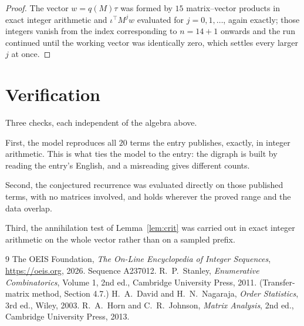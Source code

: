 \documentclass[11pt,a4paper]{article}
\theoremstyle{plain}
\theoremstyle{definition}
\begin{document}
\begin{proof}
The vector $w=q(M)\tau$ was formed by $15$ matrix--vector products in exact integer
arithmetic and $\iota^{\!\top}M^{j}w$ evaluated for $j=0,1,\dots$, again exactly; those
integers vanish from the index corresponding to $n=14+1$ onwards and the run continued
until the working vector was identically zero, which settles every larger $j$ at once.
\end{proof}

\section{Verification}

Three checks, each independent of the algebra above.

First, the model reproduces all $20$ terms the entry publishes, exactly, in integer
arithmetic. This is what ties the model to the entry: the digraph is built by reading the
entry's English, and a misreading gives different counts.

Second, the conjectured recurrence was evaluated directly on those published terms, with no
matrices involved, and holds wherever the proved range and the data overlap.

Third, the annihilation test of Lemma~\ref{lem:crit} was carried out in exact integer
arithmetic on the whole vector rather than on a sampled prefix.

\begin{thebibliography}{9}
 The OEIS Foundation, \emph{The On-Line Encyclopedia of Integer
Sequences}, \url{https://oeis.org}, 2026. Sequence A237012.
 R.~P.~Stanley, \emph{Enumerative Combinatorics}, Volume 1, 2nd ed.,
Cambridge University Press, 2011. (Transfer-matrix method, Section 4.7.)
 H.~A.~David and H.~N.~Nagaraja, \emph{Order Statistics}, 3rd ed., Wiley,
2003.
 R.~A.~Horn and C.~R.~Johnson, \emph{Matrix Analysis}, 2nd ed., Cambridge
University Press, 2013.
\end{thebibliography}
\end{document}
